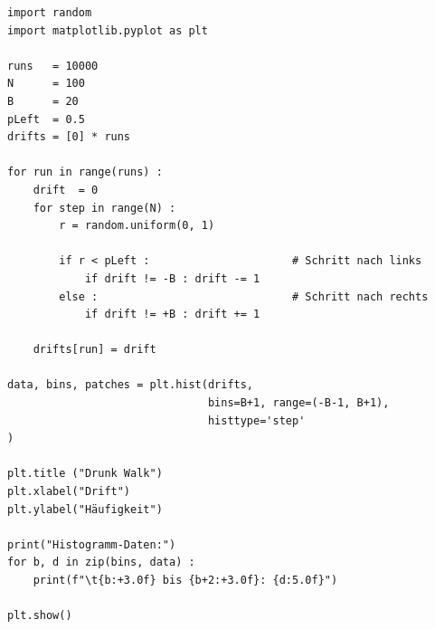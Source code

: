 \begin{codebox}
\begin{verbatim}
import random
import matplotlib.pyplot as plt

runs   = 10000
N      = 100
B      = 20
pLeft  = 0.5
drifts = [0] * runs

for run in range(runs) :
    drift  = 0
    for step in range(N) :
        r = random.uniform(0, 1)
    
        if r < pLeft :                      # Schritt nach links
            if drift != -B : drift -= 1
        else :                              # Schritt nach rechts
            if drift != +B : drift += 1
  
    drifts[run] = drift

data, bins, patches = plt.hist(drifts, 
                               bins=B+1, range=(-B-1, B+1),
                               histtype='step'
)

plt.title ("Drunk Walk")
plt.xlabel("Drift")
plt.ylabel("Häufigkeit")

print("Histogramm-Daten:")
for b, d in zip(bins, data) :
    print(f"\t{b:+3.0f} bis {b+2:+3.0f}: {d:5.0f}")

plt.show()
\end{verbatim}
\end{codebox}


